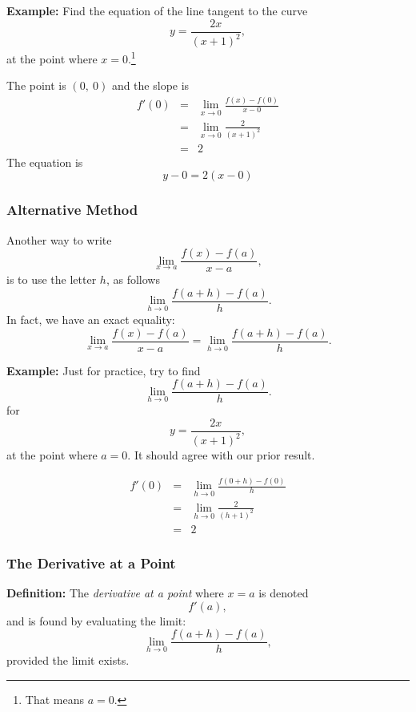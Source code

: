 \documentclass[12pt,addpoints, answers, fleqn]{exam}
\begin{document}
\textbf{Example:}  Find the equation of the line tangent to the curve
\[
y = \frac{2x}{\left(x+1\right)^2},
\]
at the point where $x=0$.\footnote{That means $a=0$.}


\begin{solution}
The point is $\left( 0, \ 0 \right)$ and the slope is
\begin{eqnarray*}
f'\left( 0 \right) &=& \lim_{x \to 0 }  \frac{f \left( x \right) - f \left( 0 \right)}{x-0}\\
&=& \lim_{x \to 0 }  \frac{2}{\left(x+1\right)^2}\\
&=& 2
\end{eqnarray*}
The equation is
\[
y - 0 = 2 \left( x - 0\right)
\]
\end{solution}

\subsubsection{Alternative Method}

Another way to write
\[
\mathop {\lim }\limits_{x \to a }  \frac{f \left( x \right) - f \left( a \right)}{x-a},
\]
is to use the letter $h$, as follows
\[
\mathop {\lim }\limits_{h \to 0 }  \frac{f \left( a+h \right) - f \left( a \right)}{h}.
\]
In fact, we have an exact equality:
\[
\mathop {\lim }\limits_{x \to a }  \frac{f \left( x \right) - f \left( a \right)}{x-a} = \mathop {\lim }\limits_{h \to 0 }  \frac{f \left( a+h \right) - f \left( a \right)}{h}.
\]



\textbf{Example:} Just for practice, try to find
\[
\mathop {\lim }\limits_{h \to 0 }  \frac{f \left( a+h \right) - f \left( a \right)}{h}.
\]
for
\[
y = \frac{2x}{\left(x+1\right)^2},
\]
at the point where $a=0$. It should agree with our prior result.

\begin{solution}
\begin{eqnarray*}
f'\left( 0 \right) &=& \lim_{h \to 0 }  \frac{f \left( 0+h \right) - f \left( 0 \right)}{h}\\
&=& \lim_{h \to 0 }  \frac{2}{\left( h + 1 \right)^2}\\
&=& 2 
\end{eqnarray*}
\end{solution}




\subsubsection{The Derivative at a Point}
\textbf{Definition:} The \emph{derivative at a point} where $x=a$ is denoted
\[
f'\left(a\right),
\]
and is found by evaluating the limit:
\[
\mathop {\lim }\limits_{h \to 0 }  \frac{f \left( a+h \right) - f \left( a \right)}{h},
\]
provided the limit exists.
\end{document}
